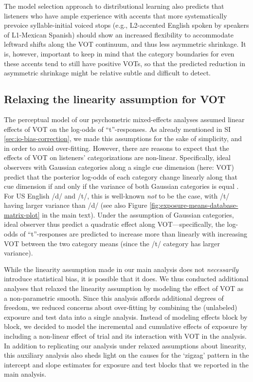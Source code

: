 \documentclass[
  11pt,
  man,mask,floatsintext]{apa6}
\begin{document}
The model selection approach to distributional learning also predicts that listeners who have ample experience with accents that more systematically prevoice syllable-initial voiced stops (e.g., L2-accented English spoken by speakers of L1-Mexican Spanish) should show an increased flexibility to accommodate leftward shifts along the VOT continuum, and thus less asymmetric shrinkage. It is, however, important to keep in mind that the category boundaries for even these accents tend to still have positive VOTs, so that the predicted reduction in asymmetric shrinkage might be relative subtle and difficult to detect.

\subsection{Relaxing the linearity assumption for VOT}\label{sec:GAMM}

The perceptual model of our psychometric mixed-effects analyses assumed linear effects of VOT on the log-odds of ``t''-responses. As already mentioned in SI \ref{sec:io-bias-correction}, we made this assumptions for the sake of simplicity, and in order to avoid over-fitting. However, there are reasons to expect that the effects of VOT on listeners' categorizations are non-linear. Specifically, ideal observers with Gaussian categories along a single cue dimension (here: VOT) predict that the posterior log-odds of each category change linearly along that cue dimension if and only if the variance of both Gaussian categories is equal \autocites[for details, see][]{bicknell2024,kleinschmidt-jaeger2015,kronrod2016}. For US English /d/ and /t/, this is well-known \emph{not} to be the case, with /t/ having larger variance than /d/ (see also Figure \ref{fig:exposure-means-database-matrix-plot} in the main text). Under the assumption of Gaussian categories, ideal observer thus predict a quadratic effect along VOT---specifically, the log-odds of ``t''-responses are predicted to increase more than linearly with increasing VOT between the two category means (since the /t/ category has larger variance).

While the linearity assumption made in our main analysis does not \emph{necessarily} introduce statistical bias, it is possible that it does. We thus conducted additional analyses that relaxed the linearity assumption by modeling the effect of VOT as a non-parametric smooth. Since this analysis affords additional degrees of freedom, we reduced concerns about over-fitting by combining the (unlabeled) exposure and test data into a single analysis. Instead of modeling effects block by block, we decided to model the incremental and cumulative effects of exposure by including a non-linear effect of trial and its interaction with VOT in the analysis. In addition to replicating our analysis under relaxed assumptions about linearity, this auxiliary analysis also sheds light on the causes for the `zigzag' pattern in the intercept and slope estimates for exposure and test blocks that we reported in the main analysis.
\end{document}
